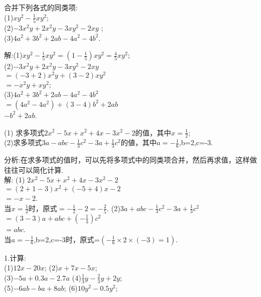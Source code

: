 \documentclass[UTF8]{report}
\theoremstyle{definition}
\theoremstyle{remark}
\begin{document}
\begin{Exercise}合并下列各式的同类项:
 \\(1)$xy^{2}-\frac{1}{5}xy^{2}$;
 \\(2)$-3x^{2}y+2x^{2}y-3xy^{2}-2xy$ ;
 \\(3)$4a^{2}+3b^{2}+2ab-4a^{2}-4b^{2}$.
 \end{Exercise}
 \begin{Answer}
 解:(1)$xy^{2}-\frac{1}{5}xy^{2}=(1-\frac{1}{5})xy^{2}=\frac{4}{5}xy^{2}$;
 \\(2)$-3x^{2}y+2x^{2}y-3xy^{2}-2xy$
 \\$=(-3+2)x^{2}y+(3-2)xy^{2}$
 \\$=-x^{2}y+xy^{2}$;
 \\(3)$4a^{2}+3b^{2}+2ab-4a^{2}-4b^{2}$
 \\$=(4a^{2}-4a^{2})+(3-4)b^{2}+2ab$
 \\$-b^{2}+2ab$.
 \end{Answer}

\begin{Exercise}
(1) 求多项式$2x^{2}-5x+x^{2}+4x-3x^{2}-2$的值，其中$x=\frac{1}{2}$;
 \\(2)求多项式$3a-abc-\frac{1}{3}c^{2}-3a+\frac{1}{3}c^{2}$的値，其中$a=-\frac{1}{6}$,b=2,c=-3.
\end{Exercise}
 \begin{Answer}
分析:在求多项式的值时，可以先将多项式中的同类项合并，然后再求值，这样做往往可以简化计算.
\\ 解: (1) $2x^{2}-5x+x^{2}+4x-3x^{2}-2$
      \\$=(2+1-3)x^{2}+(-5+4)x-2$
      \\$=-x-2$.
\\ 当$x=\frac{1}{2}$时，原式$=-\frac{1}{2}-2=-\frac{2}{5}$.
(2)$3a+abc-\frac{1}{3}c^{2}-3a+\frac{1}{3}c^{2}$
\\$=(3-3)a+abc+(-\frac{1}{3})c^{2}$
\\$=abc$.
\\ 当$a=-\frac{1}{6}$,b=2,c=-3时，原式=$(-\frac{1}{6}\times2\times(-3)=1)$.
\end{Answer}

\begin{Exercise}
1.计算:
      \\(1)$12x-20x$;  (2)$x+7x-5x$;
      \\(3)$-5a+0.3a-2.7a$  (4)$\frac{1}{3}y-\frac{2}{3}y+2y$;
      \\(5)$-6ab-ba+8ab$;  (6)$10y^{2}-0.5y^{2}$;
\end{Exercise}
\end{document}
